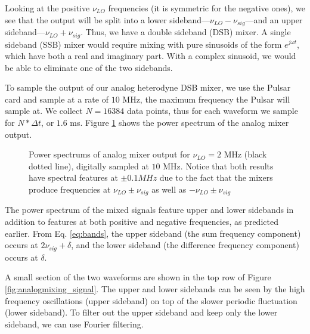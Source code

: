 \documentclass[12pt]{article}
\begin{document}
Looking at the positive $\nu_{LO}$ frequencies (it is symmetric for the negative ones), we see that the output will be split into a lower sideband---$\nu_{LO} - \nu_{sig}$---and an upper sideband---$\nu_{LO} + \nu_{sig}$. Thus, we have a double sideband (DSB) mixer. A single sideband (SSB) mixer would require mixing with pure sinusoids of the form $e^{j\omega t}$, which have both a real and imaginary part. With a complex sinusoid, we would be able to eliminate one of the two sidebands.

To sample the output of our analog heterodyne DSB mixer, we use the Pulsar card and sample at a rate of $10$ MHz, the maximum frequency the Pulsar will sample at. We collect $N=16384$ data points, thus for each waveform we sample for $N*\Delta{t}$, or $1.6$ ms. Figure \ref{fig:analogmixing_spectrum} shows the power spectrum of the analog mixer output.

\begin{figure}[H]
\caption[SODUMB]{Power spectrums of analog mixer output for $\nu_{LO}=2$ MHz (black dotted line), digitally sampled at $10$ MHz. Notice that both results have spectral features at $\pm 0.1 MHz$ due to the fact that the mixers produce frequencies at $\nu_{LO} \pm \nu_{sig}$ as well as $-\nu_{LO} \pm \nu_{sig}$}
\label{fig:analogmixing_spectrum}
\end{figure}

The power spectrum of the mixed signals feature upper and lower sidebands in addition to features at both positive and negative frequencies, as predicted earlier. From Eq. \ref{eq:bands}, the upper sideband (the sum frequency component) occurs at $2\nu_{sig} + \delta$, and the lower sideband (the difference frequency component) occurs at $\delta$.

A small section of the two waveforms are shown in the top row of Figure \ref{fig:analogmixing_signal}. The upper and lower sidebands can be seen by the high frequency oscillations (upper sideband) on top of the slower periodic fluctuation (lower sideband). To filter out the upper sideband and keep only the lower sideband, we can use Fourier filtering.
\end{document}
